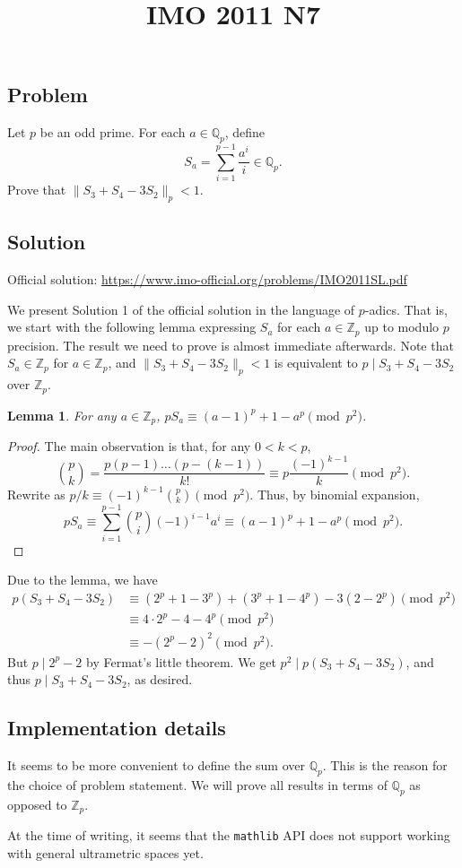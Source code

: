 \documentclass{article}
\title{IMO 2011 N7}
\author{}
\date{}
\newcommand{\Z}{\mathbb{Z}}
\newcommand{\Q}{\mathbb{Q}}
\newtheorem*{lemma*}{Lemma}
\begin{document}
\maketitle



\subsection*{Problem}

Let $p$ be an odd prime.
For each $a \in \Q_p$, define
\[ S_a = \sum_{i = 1}^{p - 1} \frac{a^i}{i} \in \Q_p. \]
Prove that $\|S_3 + S_4 - 3 S_2\|_p < 1$.



\subsection*{Solution}

Official solution: \url{https://www.imo-official.org/problems/IMO2011SL.pdf}

We present Solution 1 of the official solution in the language of $p$-adics.
That is, we start with the following lemma expressing $S_a$ for each $a \in \Z_p$ up to modulo $p$ precision.
The result we need to prove is almost immediate afterwards.
Note that $S_a \in \Z_p$ for $a \in \Z_p$, and $\|S_3 + S_4 - 3 S_2\|_p < 1$ is equivalent to $p \mid S_3 + S_4 - 3 S_2$ over $\Z_p$.

\begin{lemma*}
For any $a \in \Z_p$, $p S_a \equiv (a - 1)^p + 1 - a^p \pmod{p^2}$.
\end{lemma*}
\begin{proof}
The main observation is that, for any $0 < k < p$,
\[ \binom{p}{k} = \frac{p(p - 1) \ldots (p - (k - 1))}{k!} \equiv p \frac{(-1)^{k - 1}}{k} \pmod{p^2}. \]
Rewrite as $p/k \equiv (-1)^{k - 1} \binom{p}{k} \pmod{p^2}$.
Thus, by binomial expansion,
\[ p S_a \equiv \sum_{i = 1}^{p - 1} \binom{p}{i} (-1)^{i - 1} a^i \equiv (a - 1)^p + 1 - a^p \pmod{p^2}. \]
\end{proof}

Due to the lemma, we have
\begin{align*}
    p (S_3 + S_4 - 3 S_2)
    &\equiv (2^p + 1 - 3^p) + (3^p + 1 - 4^p) - 3 (2 - 2^p) \pmod{p^2} \\
    &\equiv 4 \cdot 2^p - 4 - 4^p \pmod{p^2} \\
    &\equiv -(2^p - 2)^2 \pmod{p^2}.
\end{align*}
But $p \mid 2^p - 2$ by Fermat's little theorem.
We get $p^2 \mid p (S_3 + S_4 - 3 S_2)$, and thus $p \mid S_3 + S_4 - 3 S_2$, as desired.



\subsection*{Implementation details}

It seems to be more convenient to define the sum over $\Q_p$.
This is the reason for the choice of problem statement.
We will prove all results in terms of $\Q_p$ as opposed to $\Z_p$.

At the time of writing, it seems that the \texttt{mathlib} API does not support working with general ultrametric spaces yet.
\end{document}
